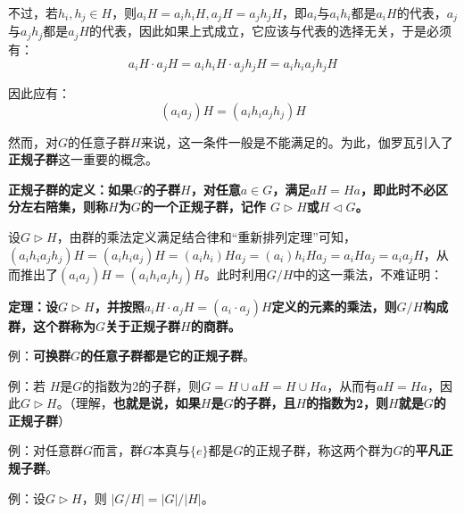 \documentclass[12pt]{article}
\begin{document}
不过，若$h_i, h_j \in H$，则$a_iH = a_ih_iH, a_jH = a_jh_jH$，即$a_i$与$a_ih_i$都是$a_iH$的代表，$a_j$与$a_jh_j$都是$a_jH$的代表，因此如果上式成立，它应该与代表的选择无关，于是必须有：
$$
a_iH \cdot a_jH = a_ih_iH \cdot a_jh_jH = a_ih_ia_jh_jH
$$

因此应有：
$$
(a_ia_j)H = (a_ih_ia_jh_j)H
$$

然而，对$G$的任意子群$H$来说，这一条件一般是不能满足的。为此，伽罗瓦引入了\textbf{正规子群}这一重要的概念。
\begin{mdframed}[
linecolor=black!40,outerlinewidth=1pt,roundcorner=.5em,innertopmargin=1ex,innerbottommargin=.5\baselineskip,innerrightmargin=1em,innerleftmargin=1em,backgroundcolor=gray!5,
]
\textbf{
正规子群的定义：如果$G$的子群$H$，对任意$a \in G$，满足$aH = Ha$，即此时不必区分左右陪集，则称$H$为$G$的一个正规子群，记作 $G \rhd H$或$H \lhd G$。
}
\end{mdframed}

设$G \rhd H$，由群的乘法定义满足结合律和“重新排列定理”可知，$(a_ih_ia_jh_j)H = (a_ih_ia_j)H =  (a_ih_i)Ha_j =  (a_i)h_iHa_j = a_iHa_j = a_ia_jH$，从而推出了$(a_ia_j)H = (a_ih_ia_jh_j)H$。此时利用$G/H$中的这一乘法，不难证明：
\begin{mdframed}[
linecolor=black!40,outerlinewidth=1pt,roundcorner=.5em,innertopmargin=1ex,innerbottommargin=.5\baselineskip,innerrightmargin=1em,innerleftmargin=1em,backgroundcolor=gray!5,
]
\textbf{
定理：设$G \rhd H$，并按照$a_iH \cdot a_jH = (a_i\cdot a_j)H$定义的元素的乘法，则$G/H$构成群，这个群称为$G$关于正规子群$H$的商群。
}
\end{mdframed}

\begin{framed}
例：\textbf{可换群$G$的任意子群都是它的正规子群}。

例：若 $H$是$G$的指数为2的子群，则$G = H \cup aH = H \cup Ha$，从而有$aH = Ha$，因此$G \rhd H$。（理解，\textbf{也就是说，如果$H$是$G$的子群，且$H$的指数为2，则$H$就是$G$的正规子群}）

例：对任意群$G$而言，群$G$本真与$\{e\}$都是$G$的正规子群，称这两个群为$G$的\textbf{平凡正规子群}。

例：设$G \rhd H$，则 $|G/H| = |G| / |H|$。
\end{framed}
\end{document}
